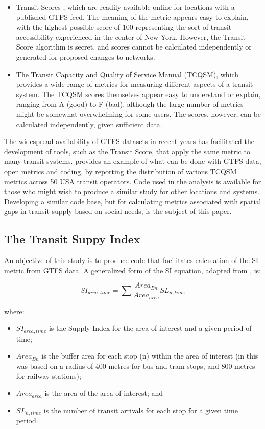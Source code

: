 \documentclass[preprint, 3p,
authoryear]{elsarticle} %
\begin{document}
\begin{itemize}
\item
  Transit Scores \citep{WalkScore:2023tg}, which are readily available
  online for locations with a published GTFS feed. The meaning of the
  metric appears easy to explain, with the highest possible score of 100
  representing the sort of transit accessibility experienced in the
  center of New York. However, the Transit Score algorithm is secret,
  and scores cannot be calculated independently or generated for
  proposed changes to networks.
\item
  The Transit Capacity and Quality of Service Manual (TCQSM), which
  provides a wide range of metrics for measuring different aspects of a
  transit system. The TCQSM scores themselves appear easy to understand
  or explain, ranging from A (good) to F (bad), although the large
  number of metrics might be somewhat overwhelming for some users. The
  scores, however, can be calculated independently, given sufficient
  data.
\end{itemize}

The widespread availability of GTFS datasets in recent years has
facilitated the development of tools, such as the Transit Score, that
apply the same metric to many transit systems. \citet{Wong:2013aa}
provides an example of what can be done with GTFS data, open metrics and
coding, by reporting the distribution of various TCQSM metrics across 50
USA transit operators. Code used in the \citet{Wong:2013aa} analysis is
available for those who might wish to produce a similar study for other
locations and systems. Developing a similar code base, but for
calculating metrics associated with spatial gaps in transit supply based
on social needs, is the subject of this paper.

\subsection{The Transit Suppy Index}\label{the-transit-suppy-index}

An objective of this study is to produce code that facilitates
calculation of the SI metric from GTFS data. A generalized form of the
SI equation, adapted from \citet{currie2010identifying}, is:

\[SI_{area, time} = \sum{\frac{Area_{Bn}}{Area_{area}}SL_{n, time}}\]

where:

\begin{itemize}
\item
  \(SI_{area, time}\) is the Supply Index for the area of interest and a
  given period of time;
\item
  \(Area_{Bn}\) is the buffer area for each stop (n) within the area of
  interest (in \citet{currie2010identifying} this was based on a radius
  of 400 metres for bus and tram stops, and 800 metres for railway
  stations);
\item
  \(Area_{area}\) is the area of the area of interest; and
\item
  \(SL_{n,time}\) is the number of transit arrivals for each stop for a
  given time period.
\end{itemize}
\end{document}
